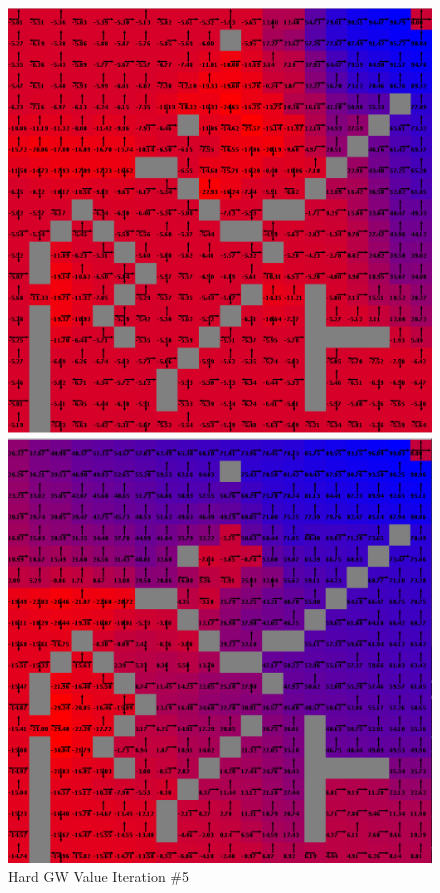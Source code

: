 \documentclass[h]{article}
\begin{document}
   \begin{figure}[H]
      \includegraphics[width=1\textwidth,keepaspectratio]{hard-value-5.png} 
      \caption*{Hard GW Value Iteration \#5} 
   \endminipage\hfill
      \includegraphics[width=1\textwidth,keepaspectratio]{hard-value-15.png} 

\end{figure}
\end{document}
